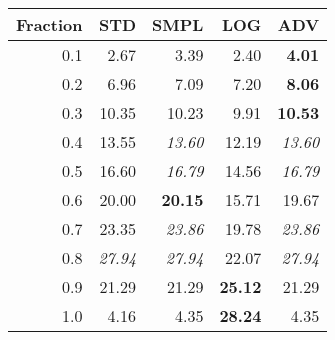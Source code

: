 \documentclass{standalone}
\begin{document}
\begin{tabular}{r|rrrr}
      \toprule
      Fraction & STD & SMPL & LOG & ADV\\
      \midrule
      0.1 & 2.67 & 3.39 & 2.40 & \textbf{4.01}\\
  0.2 & 6.96 & 7.09 & 7.20 & \textbf{8.06}\\
  0.3 & 10.35 & 10.23 & 9.91 & \textbf{10.53}\\
  0.4 & 13.55 & \emph{13.60} & 12.19 & \emph{13.60}\\
  0.5 & 16.60 & \emph{16.79} & 14.56 & \emph{16.79}\\
  0.6 & 20.00 & \textbf{20.15} & 15.71 & 19.67\\
  0.7 & 23.35 & \emph{23.86} & 19.78 & \emph{23.86}\\
  0.8 & \emph{27.94} & \emph{27.94} & 22.07 & \emph{27.94}\\
  0.9 & 21.29 & 21.29 & \textbf{25.12} & 21.29\\
  1.0 & 4.16 & 4.35 & \textbf{28.24} & 4.35\\
  \bottomrule
\end{tabular}
\end{document}
